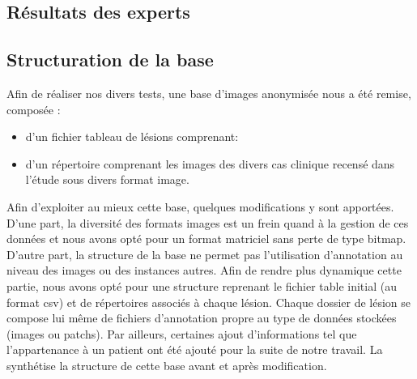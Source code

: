 \subsection{Résultats des experts}

\subsection{Structuration de la base}
Afin de réaliser nos divers tests, une base d'images anonymisée nous a été remise, composée :
\begin{itemize}
\item d'un fichier tableau de lésions comprenant:
    \item d'un répertoire comprenant les images des divers cas clinique recensé dans l'étude sous divers format image.
\end{itemize}\par

Afin d'exploiter au mieux cette base, quelques modifications y sont apportées. D'une part, la diversité des formats images est un frein quand à la gestion de ces données et nous avons opté pour un format matriciel sans perte de type bitmap. D'autre part, la structure de la base ne permet pas l'utilisation d'annotation au niveau des images ou des instances autres. Afin de rendre plus dynamique cette partie, nous avons opté pour une structure reprenant le fichier table initial (au format \gls{csv}) et de répertoires associés à chaque lésion. Chaque dossier de lésion se compose lui même de fichiers d'annotation propre au type de données stockées (images ou patchs). Par ailleurs, certaines ajout d'informations tel que l'appartenance à un patient ont été ajouté pour la suite de notre travail. La  synthétise la structure de cette base avant et après modification.\par


